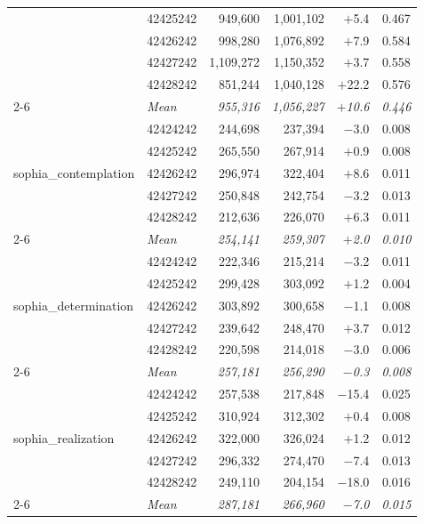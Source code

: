 \documentclass[10pt,twocolumn,letterpaper]{article}
\begin{document}
\begin{table}[t]
\begin{tabular}{llrrrc}
 & 42425242 & 949,600 & 1,001,102 & $+$5.4 & 0.467 \\
 & 42426242 & 998,280 & 1,076,892 & $+$7.9 & 0.584 \\
 & 42427242 & 1,109,272 & 1,150,352 & $+$3.7 & 0.558 \\
 & 42428242 & 851,244 & 1,040,128 & $+$22.2 & 0.576 \\
\cmidrule{2-6}
 & \textit{Mean} & \textit{955,316} & \textit{1,056,227} & \textit{$+$10.6} & \textit{0.446} \\
\midrule
\multirow{5}{*}{sophia\_contemplation}
 & 42424242 & 244,698 & 237,394 & $-$3.0 & 0.008 \\
 & 42425242 & 265,550 & 267,914 & $+$0.9 & 0.008 \\
 & 42426242 & 296,974 & 322,404 & $+$8.6 & 0.011 \\
 & 42427242 & 250,848 & 242,754 & $-$3.2 & 0.013 \\
 & 42428242 & 212,636 & 226,070 & $+$6.3 & 0.011 \\
\cmidrule{2-6}
 & \textit{Mean} & \textit{254,141} & \textit{259,307} & \textit{$+$2.0} & \textit{0.010} \\
\midrule
\multirow{5}{*}{sophia\_determination}
 & 42424242 & 222,346 & 215,214 & $-$3.2 & 0.011 \\
 & 42425242 & 299,428 & 303,092 & $+$1.2 & 0.004 \\
 & 42426242 & 303,892 & 300,658 & $-$1.1 & 0.008 \\
 & 42427242 & 239,642 & 248,470 & $+$3.7 & 0.012 \\
 & 42428242 & 220,598 & 214,018 & $-$3.0 & 0.006 \\
\cmidrule{2-6}
 & \textit{Mean} & \textit{257,181} & \textit{256,290} & \textit{$-$0.3} & \textit{0.008} \\
\midrule
\multirow{5}{*}{sophia\_realization}
 & 42424242 & 257,538 & 217,848 & $-$15.4 & 0.025 \\
 & 42425242 & 310,924 & 312,302 & $+$0.4 & 0.008 \\
 & 42426242 & 322,000 & 326,024 & $+$1.2 & 0.012 \\
 & 42427242 & 296,332 & 274,470 & $-$7.4 & 0.013 \\
 & 42428242 & 249,110 & 204,154 & $-$18.0 & 0.016 \\
\cmidrule{2-6}
 & \textit{Mean} & \textit{287,181} & \textit{266,960} & \textit{$-$7.0} & \textit{0.015} \\
\bottomrule
\end{tabular}
\end{table}
\end{document}
